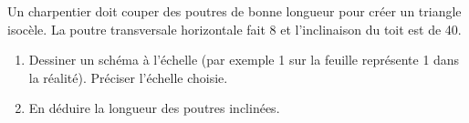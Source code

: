 
\begin{exercice}\label{exosmath-0824}

    Un charpentier doit couper des poutres de bonne longueur pour créer un triangle isocèle. La poutre transversale horizontale fait \unit{8}{\meter} et l'inclinaison du toit est de \unit{40}{\degree}. 
    \begin{enumerate}
        \item
            Dessiner un schéma à l'échelle (par exemple \unit{1}{\centi\meter} sur la feuille représente \unit{1}{\meter} dans la réalité). Préciser l'échelle choisie.
        \item
            En déduire la longueur des poutres inclinées.
    \end{enumerate}
    
\end{exercice}
